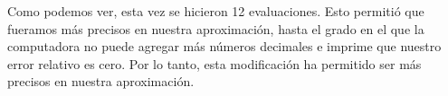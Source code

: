 \documentclass[11pt]{article}
\begin{document}
    Como podemos ver, esta vez se hicieron 12 evaluaciones. Esto permitió
que fueramos más precisos en nuestra aproximación, hasta el grado en el
que la computadora no puede agregar más números decimales e imprime que
nuestro error relativo es cero. Por lo tanto, esta modificación ha
permitido ser más precisos en nuestra aproximación.


    
    
    
\end{document}
